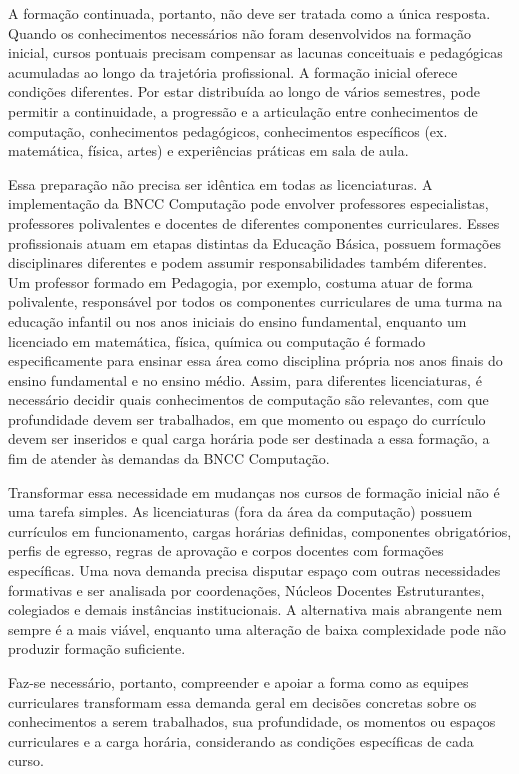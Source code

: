 A formação continuada, portanto, não deve ser tratada como a única resposta. Quando os conhecimentos necessários não foram desenvolvidos na formação inicial, cursos pontuais precisam compensar as lacunas conceituais e pedagógicas acumuladas ao longo da trajetória profissional. A formação inicial oferece condições diferentes. Por estar distribuída ao longo de vários semestres, pode permitir a continuidade, a progressão e a articulação entre conhecimentos de computação, conhecimentos pedagógicos, conhecimentos específicos (ex. matemática, física, artes) e experiências práticas em sala de aula.

Essa preparação não precisa ser idêntica em todas as licenciaturas. A implementação da BNCC Computação pode envolver professores especialistas, professores polivalentes e docentes de diferentes componentes curriculares. Esses profissionais atuam em etapas distintas da Educação Básica, possuem formações disciplinares diferentes e podem assumir responsabilidades também diferentes. Um professor formado em Pedagogia, por exemplo, costuma atuar de forma polivalente, responsável por todos os componentes curriculares de uma turma na educação infantil ou nos anos iniciais do ensino fundamental, enquanto um licenciado em matemática, física, química ou computação é formado especificamente para ensinar essa área como disciplina própria nos anos finais do ensino fundamental e no ensino médio. Assim, para diferentes licenciaturas, é necessário decidir quais conhecimentos de computação são relevantes, com que profundidade devem ser trabalhados, em que momento ou espaço do currículo devem ser inseridos e qual carga horária pode ser destinada a essa formação, a fim de atender às demandas da BNCC Computação.

Transformar essa necessidade em mudanças nos cursos de formação inicial não é uma tarefa simples. As licenciaturas (fora da área da computação) possuem currículos em funcionamento, cargas horárias definidas, componentes obrigatórios, perfis de egresso, regras de aprovação e corpos docentes com formações específicas. Uma nova demanda precisa disputar espaço com outras necessidades formativas e ser analisada por coordenações, Núcleos Docentes Estruturantes, colegiados e demais instâncias institucionais. A alternativa mais abrangente nem sempre é a mais viável, enquanto uma alteração de baixa complexidade pode não produzir formação suficiente.

Faz-se necessário, portanto, compreender e apoiar a forma como as equipes curriculares transformam essa demanda geral em decisões concretas sobre os conhecimentos a serem trabalhados, sua profundidade, os momentos ou espaços curriculares e a carga horária, considerando as condições específicas de cada curso.

